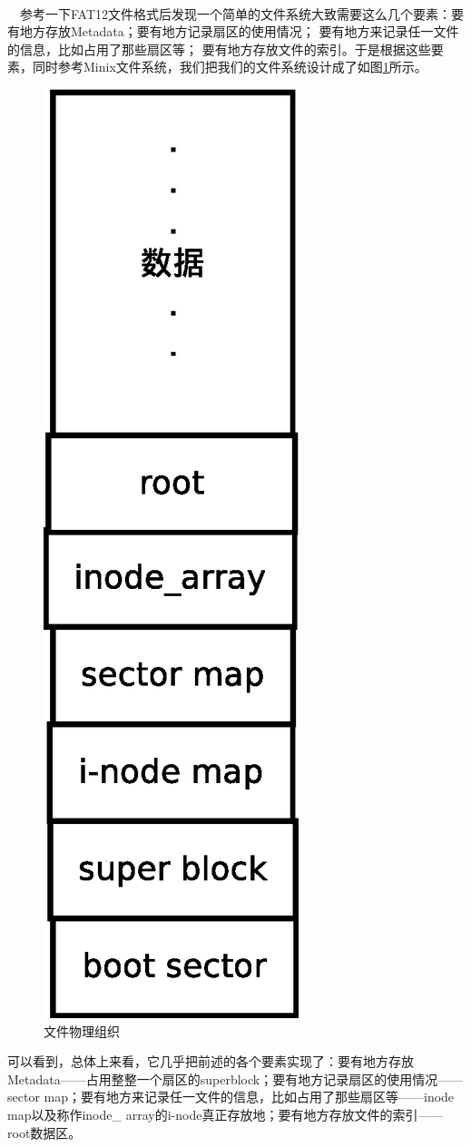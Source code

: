 \documentclass[UTF8,nofonts,cs4size]{ctexrep}
\begin{document}
\paragraph{}
\indent \ \ 参考一下FAT12文件格式后发现一个简单的文件系统大致需要这么几个要素：要有地方存放Metadata；要有地方记录扇区的使用情况；
要有地方来记录任一文件的信息，比如占用了那些扇区等；
要有地方存放文件的索引。于是根据这些要素，同时参考Minix文件系统，我们把我们的文件系统设计成了如图\ref{file}所示。
\begin{figure}[htp]
\centering
\includegraphics[scale=0.4]{file.eps}
\caption{文件物理组织}
\label{file}
\end{figure}
可以看到，总体上来看，它几乎把前述的各个要素实现了：要有地方存放Metadata——占用整整一个扇区的superblock；要有地方记录扇区的使用情况——sector map；要有地方来记录任一文件的信息，比如占用了那些扇区等——inode map以及称作inode\_ array的i-node真正存放地；要有地方存放文件的索引——root数据区。
\end{document}
